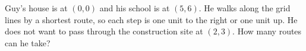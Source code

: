 Guy's house is at $(0,0)$ and his school is at $(5,6)$. He walks along the grid lines by a shortest route, so each step is one unit to the right or one unit up. He does not want to pass through the construction site at $(2,3)$. How many routes can he take?
